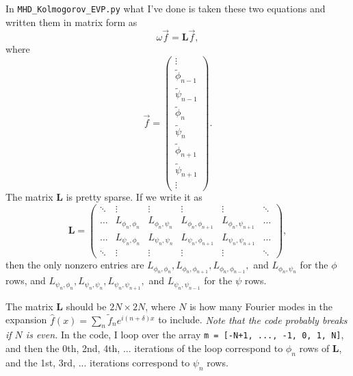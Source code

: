\documentclass[aps,pop,preprint]{revtex4}
\begin{document}
	In \texttt{MHD\_Kolmogorov\_EVP.py} what I've done is taken these two equations and written them in matrix form as
	\begin{equation}\label{eq:eigproblem}
	\omega \vec{f} = \mathbf{L} \vec{f},
	\end{equation}
	where
	\begin{equation}
	\vec{f} = \begin{pmatrix}
	\vdots\\
	\tilde{\phi}_{n-1}\\
	\tilde{\psi}_{n-1}\\
	\tilde{\phi}_n\\
	\tilde{\psi}_n\\
	\tilde{\phi}_{n+1}\\
	\tilde{\psi}_{n+1}\\
	\vdots
	\end{pmatrix}.
	\end{equation}
	The matrix $\mathbf{L}$ is pretty sparse. If we write it as
	\begin{equation}
	\mathbf{L} = \begin{pmatrix}
	\ddots & \vdots & \vdots & \vdots & \vdots & \ddots\\
	\dots & L_{\phi_n, \phi_n} & L_{\phi_n, \psi_n} & L_{\phi_n, \phi_{n+1}} & L_{\phi_n, \psi_{n+1}} & \dots\\
	\dots & L_{\psi_n, \phi_n} & L_{\psi_n, \psi_n} & L_{\psi_n, \phi_{n+1}} & L_{\psi_n, \psi_{n+1}} & \dots\\
	\ddots & \vdots & \vdots & \vdots & \vdots & \ddots
	\end{pmatrix},
	\end{equation}
	then the only nonzero entries are $L_{\phi_n, \phi_n}, L_{\phi_n, \phi_{n+1}}, L_{\phi_n, \phi_{n-1}},$ and $L_{\phi_n, \psi_n}$ for the $\phi$ rows, and $L_{\psi_n, \phi_n}, L_{\psi_n, \psi_n}, L_{\psi_n, \psi_{n+1}},$ and $L_{\psi_n, \psi_{n-1}}$ for the $\psi$ rows.
	
	The matrix $\mathbf{L}$ should be $2N \times 2N$, where $N$ is how many Fourier modes in the expansion $\hat{f}(x) = \sum_n \tilde{f}_n e^{i(n + \delta)x}$ to include. 
	\emph{Note that the code probably breaks if $N$ is even.} 
	In the code, I loop over the array \texttt{m = [-N+1, ..., -1, 0, 1, N]}, and then the 0th, 2nd, 4th, ... iterations of the loop correspond to $\phi_n$ rows of $\mathbf{L}$, and the 1st, 3rd, ... iterations correspond to $\psi_n$ rows.
\end{document}
